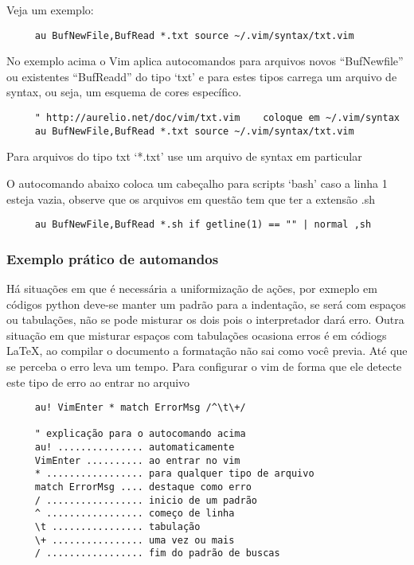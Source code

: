 Veja um exemplo:

\begin{verbatim}
     au BufNewFile,BufRead *.txt source ~/.vim/syntax/txt.vim
\end{verbatim}

No exemplo acima o Vim aplica autocomandos para arquivos novos
``BufNewfile'' ou existentes ``BufReadd'' do tipo `txt' e para estes tipos
carrega um arquivo de syntax, ou seja, um esquema de cores específico.

\begin{verbatim}
     " http://aurelio.net/doc/vim/txt.vim    coloque em ~/.vim/syntax
     au BufNewFile,BufRead *.txt source ~/.vim/syntax/txt.vim
\end{verbatim}

Para arquivos do tipo txt `*.txt' use um arquivo de syntax em particular

O autocomando abaixo coloca um cabeçalho para scripts `bash' caso a
linha 1 esteja vazia, observe que os arquivos em questão tem que ter a
extensão .sh

\begin{verbatim}
     au BufNewFile,BufRead *.sh if getline(1) == "" | normal ,sh
\end{verbatim}

\subsubsection{Exemplo prático de automandos}
\label{sub:Exemplo prático de automandos}

Há situações em que é necessária a uniformização de ações, por exmeplo em
códigos python deve-se manter um padrão para a indentação, se será com espaços
ou tabulações, não se pode misturar os dois pois o interpretador dará erro.
Outra situação em que misturar espaços com tabulações ocasiona erros é em
códiogs \LaTeX, ao compilar o documento a formatação não sai como você previa.
Até que se perceba o erro leva um tempo.  Para configurar o vim de forma que
ele detecte este tipo de erro ao entrar no arquivo

\begin{verbatim}
     au! VimEnter * match ErrorMsg /^\t\+/

     " explicação para o autocomando acima
     au! ............... automaticamente
     VimEnter .......... ao entrar no vim
     * ................. para qualquer tipo de arquivo
     match ErrorMsg .... destaque como erro
     / ................. inicio de um padrão
     ^ ................. começo de linha
     \t ................ tabulação
     \+ ................ uma vez ou mais
     / ................. fim do padrão de buscas
\end{verbatim}

